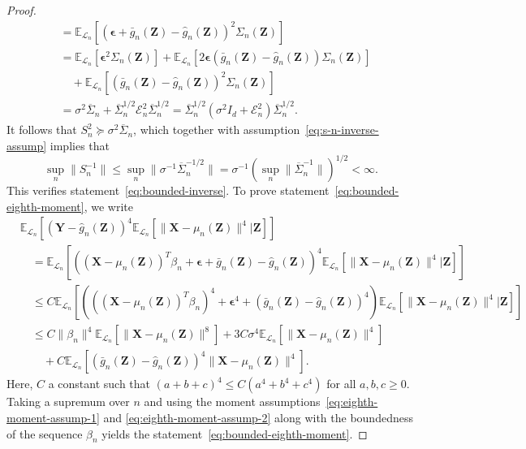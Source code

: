 \documentclass[12pt]{article}
\theoremstyle{definition}
\theoremstyle{remark}
\newcommand{\prx}{\bm X}
\newcommand{\prz}{\bm Z}
\newcommand{\pry}{{\bm Y}}
\newcommand{\peps}{\bm \epsilon}
\begin{document}
\begin{proof}
\begin{equation}
\begin{split}
		&=\mathbb E_{\mathcal L_n}[( \peps + \bar g_n(\prz)-\widehat g_n(\prz))^2 \Sigma_n(\prz)] \\
		& = \mathbb E_{\mathcal L_n}[\peps ^2 \Sigma_n(\prz)] + \mathbb E_{\mathcal L_n}[2\peps(\bar g_n(\prz)-\widehat g_n(\prz))\Sigma_n(\prz)]  \\
		&\quad + \mathbb E_{\mathcal L_n}[(\bar g_n(\prz)-\widehat g_n(\prz))^2\Sigma_n(\prz)] \\
		&= \sigma^2 \overline \Sigma_n + \overline \Sigma_n^{1/2}\mathcal E^2_n \overline \Sigma_n^{1/2}  = \overline \Sigma_n^{1/2}(\sigma^2 I_d + \mathcal E^2_n) \overline \Sigma_n^{1/2}.
		\label{eq:s-n-2-prime}
	\end{split}
\end{equation}
It follows that $S_n^2 \succcurlyeq \sigma^2 \overline \Sigma_n$, which together with assumption~\eqref{eq:s-n-inverse-assump} implies that
\begin{equation}
\sup_n \|S_n^{-1}\| \leq \sup_n \|\sigma^{-1}\overline \Sigma_n^{-1/2}\| = \sigma^{-1}\left(\sup_n \|\overline \Sigma_n^{-1}\|\right)^{1/2} < \infty.
\end{equation}
This verifies statement~\eqref{eq:bounded-inverse}.	To prove statement~\eqref{eq:bounded-eighth-moment}, we write
	\begin{equation*}
		\begin{split}
			&\mathbb E_{\mathcal L_n}\left[ (\pry - \widehat g_n(\prz))^{4}\mathbb E_{\mathcal L_n}[\|\prx - \mu_n(\prz)\|^{4}|\prz]\right] \\
			&\quad= \mathbb E_{\mathcal L_n}\left[ ((\prx - \mu_n(\prz))^T \beta_n + \peps + \bar g_n(\prz)-\widehat g_n(\prz))^4\mathbb E_{\mathcal L_n}[\|\prx - \mu_n(\prz)\|^{4}|\prz]\right] \\
			&\quad\leq C\mathbb E_{\mathcal L_n}\left[(((\prx - \mu_n(\prz))^T \beta_n)^4 + \peps^4 + (\bar g_n(\prz)-\widehat g_n(\prz))^4) \mathbb E_{\mathcal L_n}[\|\prx - \mu_n(\prz)\|^{4}|\prz]\right] \\
			&\quad\leq C\|\beta_n\|^4\mathbb E_{\mathcal L_n}[\|\prx - \mu_n(\prz)\|^{8}] + 3C\sigma^4\mathbb E_{\mathcal L_n}[\|\prx - \mu_n(\prz)\|^{4}] \\
			&\quad \quad + C \mathbb E_{\mathcal L_n}\left[(\bar g_n(\prz) - \widehat g_n(\prz))^{4} \|\prx - \mu_n(\prz)\|^{4}\right].
		\end{split}
	\end{equation*}
	Here, $C$ a constant such that $(a + b + c)^4 \leq C(a^4 + b^4 + c^4)$ for all $a,b,c \geq 0$. Taking a supremum over $n$ and using the moment assumptions~\eqref{eq:eighth-moment-assump-1} and \eqref{eq:eighth-moment-assump-2} along with the boundedness of the sequence $\beta_n$ yields the statement~\eqref{eq:bounded-eighth-moment}. 
	

\end{proof}
\end{document}
